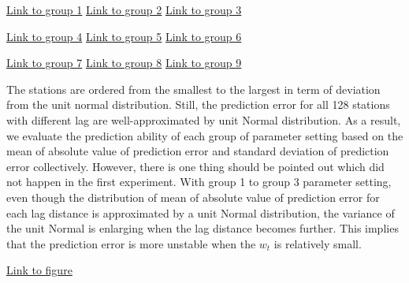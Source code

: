 \begin{framed}
\begin{center}
  \href{../plots/a1950/E2/QQ.error.tmax.group.1.pdf}{Link to group 1} 
  \;\;\;\;\;\;\;\;\;\;
  \href{../plots/a1950/E2/QQ.error.tmax.group.2.pdf}{Link to group 2} 
  \;\;\;\;\;\;\;\;\;\;
  \href{../plots/a1950/E2/QQ.error.tmax.group.3.pdf}{Link to group 3}
\end{center}
\begin{center}
  \href{../plots/a1950/E2/QQ.error.tmax.group.4.pdf}{Link to group 4} 
  \;\;\;\;\;\;\;\;\;\;
  \href{../plots/a1950/E2/QQ.error.tmax.group.5.pdf}{Link to group 5} 
  \;\;\;\;\;\;\;\;\;\;
  \href{../plots/a1950/E2/QQ.error.tmax.group.6.pdf}{Link to group 6}
\end{center}
\begin{center}
  \href{../plots/a1950/E2/QQ.error.tmax.group.7.pdf}{Link to group 7} 
  \;\;\;\;\;\;\;\;\;\;
  \href{../plots/a1950/E2/QQ.error.tmax.group.8.pdf}{Link to group 8} 
  \;\;\;\;\;\;\;\;\;\;
  \href{../plots/a1950/E2/QQ.error.tmax.group.9.pdf}{Link to group 9}
  \label{QQ.error.laggroup}
\end{center}
\end{framed}
The stations are ordered from the smallest to the largest in term of deviation
from the unit normal distribution. Still, the prediction error for all 128 
stations with different lag are well-approximated by unit Normal distribution.
As a result, we evaluate the prediction ability of each group of parameter setting
based on the mean of absolute value of prediction error and standard deviation of
prediction error collectively. However, there is one thing should be pointed out
which did not happen in the first experiment.
With group 1 to group 3 parameter setting, even though the distribution of mean
of absolute value of prediction error for each lag distance is approximated by
a unit Normal distribution, the variance of the unit Normal is enlarging when 
the lag distance becomes further. This implies that the prediction error is more
unstable when the $w_t$ is relatively small.

\begin{framed}
\begin{center}
  \href{../plots/a1950/E2/tmax.absmeans.vs.lag.sw.pdf}{Link to figure}
  \label{e2.abserrorlag.sw}
\end{center}
\end{framed}

